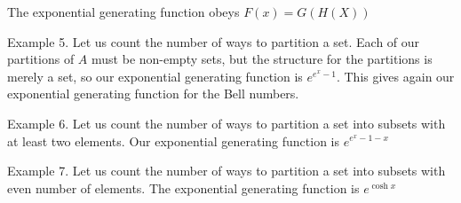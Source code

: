 The exponential generating function obeys $F(x)=G(H(X))$

Example 5. Let us count the number of ways to partition a set. Each of our partitions of $A$ must be non-empty sets, but the structure for the partitions is merely a set, so our exponential generating function is $e^{e^{x}-1}$. This gives again our exponential generating function for the Bell numbers.

Example 6. Let us count the number of ways to partition a set into subsets with at least two elements. Our exponential generating function is $e^{e^{x}-1-x}$

Example 7. Let us count the number of ways to partition a set into subsets with even number of elements. The exponential generating function is $e^{\cosh x}$